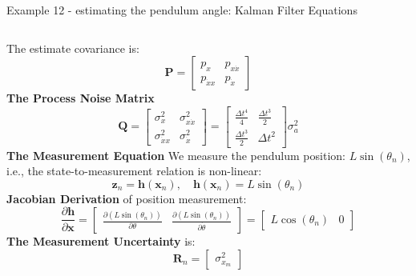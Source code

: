 \begin{frame}{Example 12 - estimating the pendulum angle: Kalman Filter Equations}
\begin{columns}
The estimate covariance is:
\[
\mathbf{P} =
\begin{bmatrix}
p_{x} & p_{x\dot{x}} \\
p_{\dot{x}x} & p_{\dot{x}}
\end{bmatrix}
\]
\textbf{The Process Noise Matrix}
\[
\mathbf{Q} =
\begin{bmatrix}
\sigma^2_{x} & \sigma^2_{x\dot{x}} \\
\sigma^2_{\dot{x}x} & \sigma^2_{\dot{x}}
\end{bmatrix}
=
\begin{bmatrix}
\frac{\Delta t^4}{4} & \frac{\Delta t^3}{2} \\
\frac{\Delta t^3}{2} & \Delta t^2
\end{bmatrix}
\sigma^2_{a}
\]
\textbf{The Measurement Equation}
We measure the pendulum position: $L \sin(\theta_n)$, i.e., the state-to-measurement relation is non-linear:
\[
\mathbf{z}_n = \mathbf{h}(\mathbf{x}_n), \quad
\mathbf{h}(\mathbf{x}_n) = L \sin(\theta_n)
\]
\textbf{Jacobian Derivation} of position measurement:
\[
\frac{\partial \mathbf{h}}{\partial \mathbf{x}} =
\begin{bmatrix}
\frac{\partial (L \sin(\theta_n))}{\partial \theta}\!\! & \!\!\frac{\partial (L \sin(\theta_n))}{\partial \dot{\theta}}
\end{bmatrix}
=
\begin{bmatrix}
L \cos(\theta_n) & 0
\end{bmatrix}
\]
\textbf{The Measurement Uncertainty} is:
\[
\mathbf{R}_n =
\begin{bmatrix}
\sigma^2_{x_m}
\end{bmatrix}
\]
\end{columns}
\end{frame}

